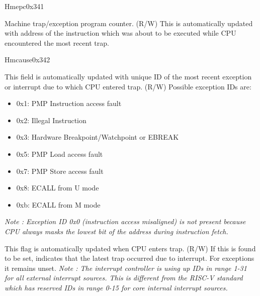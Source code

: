 \begin{register}{H}{mepc}{0x341}\label{regdesc:MEPC}
%
\regnewline%
\begin{regdesc}\begin{reglist}
\label{fielddesc:MEPC}\item [MEPC] Machine trap/exception program counter. (R/W) \newline This is automatically updated with address of the instruction which was about to be executed while CPU encountered the most recent trap.
\end{reglist}\end{regdesc}
\end{register}

\begin{register}{H}{mcause}{0x342}\label{regdesc:MCAUSE}
%
%
%
\regnewline%
\begin{regdesc}\begin{reglist}
\label{fielddesc:MCAUSECODE}\item [Exception Code] This field is automatically updated with unique ID of the most recent exception or interrupt due to which CPU entered trap. (R/W)
\newline Possible exception IDs are:
\begin{itemize}
    \setlength\itemsep{-1em}
    \item 0x1: PMP Instruction access fault
    \item 0x2: Illegal Instruction
    \item 0x3: Hardware Breakpoint/Watchpoint or EBREAK
    \item 0x5: PMP Load access fault
    \item 0x7: PMP Store access fault
    \item 0x8: ECALL from U mode
    \item 0xb: ECALL from M mode
\end{itemize}
\textit {Note : Exception ID 0x0 (instruction access misaligned) is not present because CPU always masks the lowest bit of the address during instruction fetch.}
\label{fielddesc:MCAUSEINT}\item [Interrupt Flag] This flag is automatically updated when CPU enters trap. (R/W) \newline If this is found to be set, indicates that the latest trap occurred due to interrupt. For exceptions it remains unset. \newline \textit {Note : The interrupt controller is using up IDs in range 1-31 for all external interrupt sources. This is different from the RISC-V standard which has reserved IDs in range 0-15 for core internal interrupt sources.}
\end{reglist}\end{regdesc}
\end{register}

